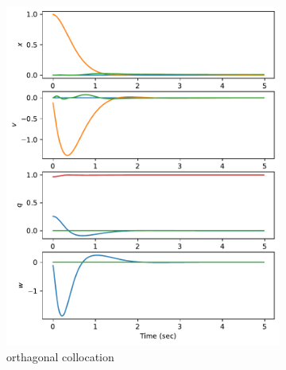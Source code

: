 \documentclass[]{article}
\begin{document}
\begin{figure}[H]
	\centering
	\begin{subfigure}[b]{0.3\textwidth}
		\centering
		\includegraphics[width=\textwidth]{statey115dx1.pdf}
		\caption{orthagonal collocation}
	\end{subfigure}%
	\begin{subfigure}[b]{0.3\textwidth}
		\centering

\end{subfigure}
\end{figure}
\end{document}
